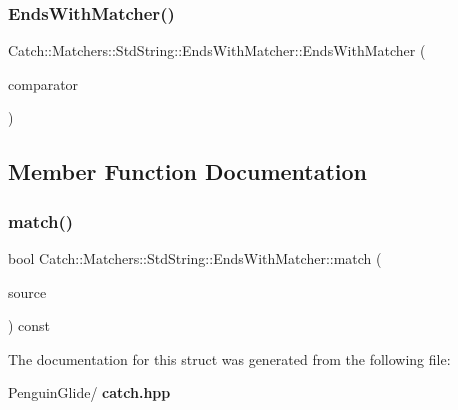 \subsubsection{EndsWithMatcher()}
{\footnotesize\ttfamily Catch\+::\+Matchers\+::\+Std\+String\+::\+Ends\+With\+Matcher\+::\+Ends\+With\+Matcher (\begin{DoxyParamCaption}\item[{\textbf{ Cased\+String} const \&}]{comparator }\end{DoxyParamCaption})}



\subsection{Member Function Documentation}
\mbox{\label{struct_catch_1_1_matchers_1_1_std_string_1_1_ends_with_matcher_aca2741fa57374a2a98d2a84ac3e13a6d}} 
\subsubsection{match()}
{\footnotesize\ttfamily bool Catch\+::\+Matchers\+::\+Std\+String\+::\+Ends\+With\+Matcher\+::match (\begin{DoxyParamCaption}\item[{std\+::string const \&}]{source }\end{DoxyParamCaption}) const\hspace{0.3cm}{\ttfamily [override]}}



The documentation for this struct was generated from the following file\+:\begin{DoxyCompactItemize}
\item 
Penguin\+Glide/\textbf{ catch.\+hpp}\end{DoxyCompactItemize}
